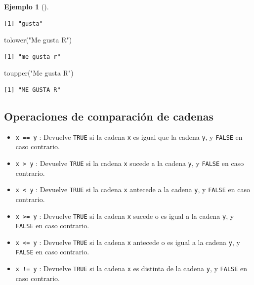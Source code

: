\documentclass[
  spanish,
  a4paper,
]{scrreport}
\newenvironment{Shaded}{\begin{snugshade}}{\end{snugshade}}
\newcommand{\FunctionTok}[1]{\textcolor[rgb]{0.28,0.35,0.67}{#1}}
\newcommand{\NormalTok}[1]{\textcolor[rgb]{0.00,0.23,0.31}{#1}}
\newcommand{\StringTok}[1]{\textcolor[rgb]{0.13,0.47,0.30}{#1}}
\providecommand{\tightlist}{%
  \setlength{\itemsep}{0pt}\setlength{\parskip}{0pt}}
\theoremstyle{definition}
\theoremstyle{definition}
\newtheorem{example}{Ejemplo}[chapter]
\theoremstyle{remark}
\begin{document}
\begin{example}[]
\begin{verbatim}
[1] "gusta"
\end{verbatim}

\begin{Shaded}
\begin{Highlighting}[]
\FunctionTok{tolower}\NormalTok{(}\StringTok{"Me gusta R"}\NormalTok{)}
\end{Highlighting}
\end{Shaded}

\begin{verbatim}
[1] "me gusta r"
\end{verbatim}

\begin{Shaded}
\begin{Highlighting}[]
\FunctionTok{toupper}\NormalTok{(}\StringTok{"Me gusta R"}\NormalTok{)}
\end{Highlighting}
\end{Shaded}

\begin{verbatim}
[1] "ME GUSTA R"
\end{verbatim}

\end{example}

\subsection{Operaciones de comparación de
cadenas}\label{operaciones-de-comparaciuxf3n-de-cadenas}

\begin{itemize}
\tightlist
\item
  \texttt{x\ ==\ y} : Devuelve \texttt{TRUE} si la cadena \texttt{x} es
  igual que la cadena \texttt{y}, y \texttt{FALSE} en caso contrario.
\item
  \texttt{x\ \textgreater{}\ y} : Devuelve \texttt{TRUE} si la cadena
  \texttt{x} sucede a la cadena \texttt{y}, y \texttt{FALSE} en caso
  contrario.
\item
  \texttt{x\ \textless{}\ y} : Devuelve \texttt{TRUE} si la cadena
  \texttt{x} antecede a la cadena \texttt{y}, y \texttt{FALSE} en caso
  contrario.
\item
  \texttt{x\ \textgreater{}=\ y} : Devuelve \texttt{TRUE} si la cadena
  \texttt{x} sucede o es igual a la cadena \texttt{y}, y \texttt{FALSE}
  en caso contrario.
\item
  \texttt{x\ \textless{}=\ y} : Devuelve \texttt{TRUE} si la cadena
  \texttt{x} antecede o es igual a la cadena \texttt{y}, y
  \texttt{FALSE} en caso contrario.
\item
  \texttt{x\ !=\ y} : Devuelve \texttt{TRUE} si la cadena \texttt{x} es
  distinta de la cadena \texttt{y}, y \texttt{FALSE} en caso contrario.
\end{itemize}
\end{document}

